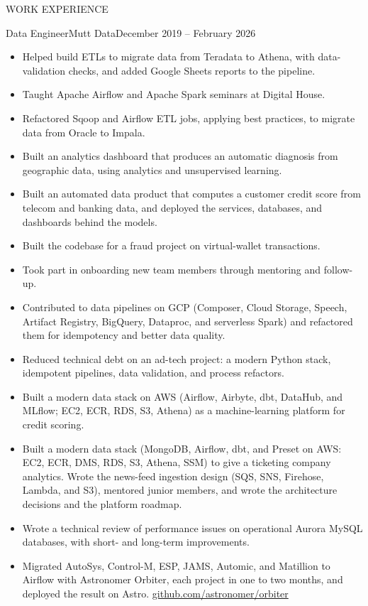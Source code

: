 \documentclass{mcdowellcv}
\begin{document}
\begin{cvsection}{WORK EXPERIENCE}
	\begin{cvsubsection}{Data Engineer}{Mutt Data}{December 2019 -- February 2026}
		\begin{itemize}
			\item Helped build ETLs to migrate data from Teradata to Athena, with data-validation checks, and added Google Sheets reports to the pipeline.
			\item Taught Apache Airflow and Apache Spark seminars at Digital House.
			\item Refactored Sqoop and Airflow ETL jobs, applying best practices, to migrate data from Oracle to Impala.
			\item Built an analytics dashboard that produces an automatic diagnosis from geographic data, using analytics and unsupervised learning.
			\item Built an automated data product that computes a customer credit score from telecom and banking data, and deployed the services, databases, and dashboards behind the models.
			\item Built the codebase for a fraud project on virtual-wallet transactions.
			\item Took part in onboarding new team members through mentoring and follow-up.
			\item Contributed to data pipelines on GCP (Composer, Cloud Storage, Speech, Artifact Registry, BigQuery, Dataproc, and serverless Spark) and refactored them for idempotency and better data quality.
			\item Reduced technical debt on an ad-tech project: a modern Python stack, idempotent pipelines, data validation, and process refactors.
			\item Built a modern data stack on AWS (Airflow, Airbyte, dbt, DataHub, and MLflow; EC2, ECR, RDS, S3, Athena) as a machine-learning platform for credit scoring.
			\item Built a modern data stack (MongoDB, Airflow, dbt, and Preset on AWS: EC2, ECR, DMS, RDS, S3, Athena, SSM) to give a ticketing company analytics. Wrote the news-feed ingestion design (SQS, SNS, Firehose, Lambda, and S3), mentored junior members, and wrote the architecture decisions and the platform roadmap.
			\item Wrote a technical review of performance issues on operational Aurora MySQL databases, with short- and long-term improvements.
			\item Migrated AutoSys, Control-M, ESP, JAMS, Automic, and Matillion to Airflow with Astronomer Orbiter, each project in one to two months, and deployed the result on Astro. \href{https://github.com/astronomer/orbiter}{github.com/astronomer/orbiter}
		\end{itemize}
	\end{cvsubsection}


\end{cvsection}
\end{document}
